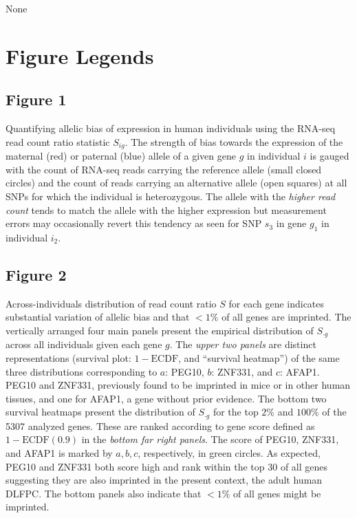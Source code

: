 \documentclass[letterpaper]{article}
\begin{document}
None

\section*{Figure Legends}

\subsection*{Figure 1}

Quantifying allelic bias of expression in human
individuals using the RNA-seq read count ratio statistic \(S_{ig}\).
The strength of
bias towards the expression of the maternal (red) or paternal (blue) allele of
a given gene \(g\) in individual \(i\) is gauged with the count of RNA-seq
reads carrying the reference allele (small closed circles) and the count of
reads carrying an alternative allele (open squares) at all SNPs for which the
individual is heterozygous.  The allele with the \emph{higher read count} tends to
match the allele with the higher expression but measurement errors may
occasionally revert this tendency as seen for SNP \(s_3\) in gene \(g_1\) in
individual \(i_2\).


\subsection*{Figure 2}

Across-individuals distribution of read count ratio \(S\) for each
gene indicates substantial variation of allelic bias and that \(<1\%\) of all
genes are imprinted.  The vertically arranged
four main panels present the empirical distribution of \(S_{\cdot g}\) across all
individuals given each gene \(g\).  The \emph{upper two panels} are distinct
representations (survival plot: \(1 - \mathrm{ECDF}\), and
``survival heatmap'') of the same three distributions corresponding to \(a\):
PEG10, \(b\): ZNF331, and \(c\): AFAP1.  PEG10 and ZNF331,
previously found to be imprinted in mice or in other human tissues, and one
for AFAP1, a gene without prior evidence.  The bottom two survival heatmaps present
the distribution of \(S_{\cdot g}\) for the top \(2\%\) and \(100\%\) of the
5307 analyzed genes.  These are ranked according to gene score defined as \(1
- \mathrm{ECDF}(0.9)\) in the \emph{bottom
far right panels}.  The score of PEG10, ZNF331, and AFAP1 is marked by
\(a,b,c\), respectively, in green circles.  As expected, PEG10 and ZNF331 both score
high and rank within the top 30 of all genes suggesting they are also imprinted in
the present context, the adult human DLFPC.  The bottom panels also indicate
that \(<1\%\) of all genes might be imprinted.
\end{document}
